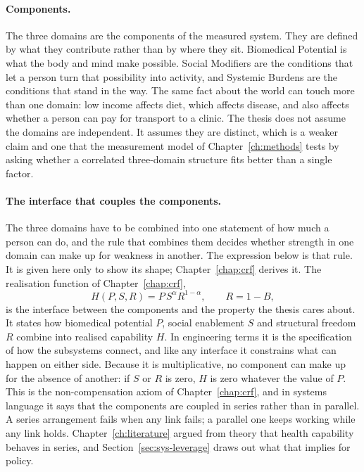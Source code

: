 \paragraph{Components.} The three domains are the components of the measured
system. They are defined by what they contribute rather than by where they
sit. Biomedical Potential is what the body and mind make possible. Social
Modifiers are the conditions that let a person turn that possibility into
activity, and Systemic Burdens are the conditions that stand in the way. The
same fact about the world can touch more than one domain: low income affects
diet, which affects disease, and also affects whether a person can pay for
transport to a clinic. The thesis does not assume the domains are
independent. It assumes they are distinct, which is a weaker claim and one
that the measurement model of Chapter~\ref{ch:methods} tests by asking whether
a correlated three-domain structure fits better than a single factor.

\paragraph{The interface that couples the components.} The three domains
have to be combined into one statement of how much a person can do, and the
rule that combines them decides whether strength in one domain can make up for
weakness in another. The expression below is that rule. It is given here only
to show its shape; Chapter~\ref{chap:crf} derives it. The realisation
function of Chapter~\ref{chap:crf},
\[
H(P,S,R)=P\,S^{\alpha}R^{1-\alpha},\qquad R=1-B,
\]
is the interface between the components and the property the thesis cares
about. It states how biomedical potential $P$, social enablement $S$ and
structural freedom $R$ combine into realised capability $H$. In engineering
terms it is the specification of how the subsystems connect, and like any
interface it constrains what can happen on either side. Because it is
multiplicative, no component can make up for the absence of another: if $S$
or $R$ is zero, $H$ is zero whatever the value of $P$. This is the
non-compensation axiom of Chapter~\ref{chap:crf}, and in systems language it
says that the components are coupled in series rather than in parallel. A
series arrangement fails when any link fails; a parallel one keeps working
while any link holds. Chapter~\ref{ch:literature} argued from theory that
health capability behaves in series, and Section~\ref{sec:sys-leverage} draws
out what that implies for policy.

